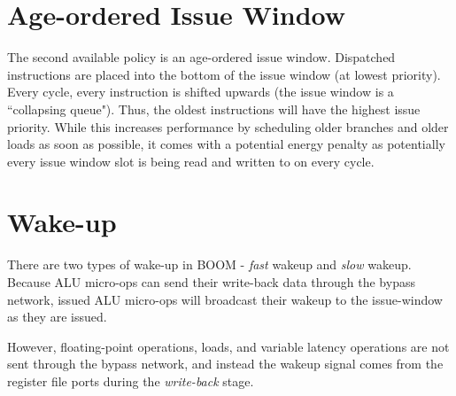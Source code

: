 \section{Age-ordered Issue Window}

The second available policy is an age-ordered issue window.  Dispatched instructions are placed into the bottom of the issue window (at lowest priority). Every cycle, every instruction is shifted upwards (the issue window is a ``collapsing queue").  Thus, the oldest instructions will have the highest issue priority.  While this increases performance by scheduling older branches and older loads as soon as possible, it comes with a potential energy penalty as potentially every issue window slot is being read and written to on every cycle. 

\section{Wake-up}

There are two types of wake-up in BOOM - {\em fast} wakeup and {\em slow} wakeup.  Because ALU micro-ops can send their write-back data through the bypass network, issued ALU micro-ops will broadcast their wakeup to the issue-window as they are issued. 

However, floating-point operations, loads, and variable latency operations are not sent through the bypass network, and instead the wakeup signal comes from the register file ports during the {\em write-back} stage. 

